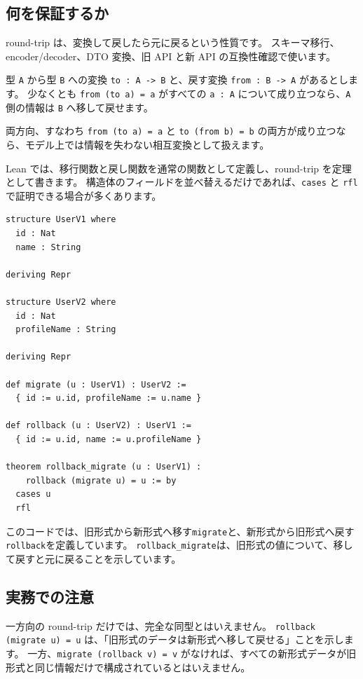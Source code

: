 \subsection{何を保証するか}

round-trip は、変換して戻したら元に戻るという性質です。
スキーマ移行、encoder/decoder、DTO 変換、旧 API と新 API の互換性確認で使います。

型 \texttt{A} から型 \texttt{B} への変換 \texttt{to : A -> B} と、戻す変換 \texttt{from : B -> A} があるとします。
少なくとも \texttt{from (to a) = a} がすべての \texttt{a : A} について成り立つなら、\texttt{A} 側の情報は \texttt{B} へ移して戻せます。

両方向、すなわち \texttt{from (to a) = a} と \texttt{to (from b) = b} の両方が成り立つなら、モデル上では情報を失わない相互変換として扱えます。

Lean では、移行関数と戻し関数を通常の関数として定義し、round-trip を定理として書きます。
構造体のフィールドを並べ替えるだけであれば、\texttt{cases} と \texttt{rfl} で証明できる場合が多くあります。

\begin{listing}[htbp]
\begin{verbatim}
structure UserV1 where
  id : Nat
  name : String

deriving Repr

structure UserV2 where
  id : Nat
  profileName : String

deriving Repr

def migrate (u : UserV1) : UserV2 :=
  { id := u.id, profileName := u.name }

def rollback (u : UserV2) : UserV1 :=
  { id := u.id, name := u.profileName }

theorem rollback_migrate (u : UserV1) :
    rollback (migrate u) = u := by
  cases u
  rfl
\end{verbatim}
\caption{\texttt{rollback\_migrate}}
\label{lst:appc_roundtrip}
\end{listing}

このコードでは、旧形式から新形式へ移す\texttt{migrate}と、新形式から旧形式へ戻す\texttt{rollback}を定義しています。
\texttt{rollback\_migrate}は、旧形式の値について、移して戻すと元に戻ることを示しています。

\subsection{実務での注意}

一方向の round-trip だけでは、完全な同型とはいえません。
\texttt{rollback (migrate u) = u} は、「旧形式のデータは新形式へ移して戻せる」ことを示します。
一方、\texttt{migrate (rollback v) = v} がなければ、すべての新形式データが旧形式と同じ情報だけで構成されているとはいえません。

